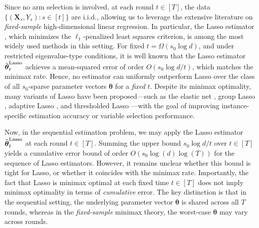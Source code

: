 \documentclass[aos,preprint]{imsart}
\theoremstyle{plain}
\theoremstyle{definition}
\newcommand{\btheta}{\boldsymbol{\theta}}
\newcommand{\bX}{\boldsymbol{X}}
\begin{document}
Since no arm selection is involved, at each round $t \in [T]$, the data $\{(\bX_s, Y_s): s \in [t]\}$ are i.i.d., allowing us to leverage the extensive literature on \textit{fixed-sample} high-dimensional linear regression. In particular, the Lasso estimator \cite{tibshirani1996regression}, which minimizes the $\ell_1$-penalized least squares criterion, is among the most widely used methods in this setting. For fixed $t = \Omega(s_0 \log d)$, and under restricted eigenvalue-type conditions, it is well known \citep{van2008high, van2016estimation, wainwright2019high} that the Lasso estimator $\hat{\btheta}_t^{\textup{Lasso}}$ achieves a mean-squared error of order $O(s_0 \log d / t)$, which matches the minimax rate. Hence, no estimator can uniformly outperform Lasso over the class of all $s_0$-sparse parameter vectors $\btheta$ for a \textit{fixed} $t$. 
Despite its minimax optimality, many variants of Lasso have been proposed---such as the elastic net \cite{zou2005regularization}, group Lasso \cite{yuan2006model}, adaptive Lasso \cite{zou2006adaptive}, and thresholded Lasso  \cite{van2011adaptive, belloni2013least}---with the goal of improving instance-specific estimation accuracy or variable selection performance.

Now, in the sequential estimation problem, we may apply the Lasso estimator $\hat{\btheta}_t^{\textup{Lasso}}$ at each round $t \in [T]$. Summing the upper bound $s_0 \log d  / t$ over $t \in [T]$  yields a cumulative error bound of order $O(s_0 \log(d) \log(T))$ for the sequence of Lasso estimators. However, it remains unclear whether this bound is tight for Lasso, or whether it coincides with the minimax rate. Importantly, the fact that Lasso is minimax optimal at each fixed time $t \in [T]$ does not imply minimax optimality in terms of \textit{cumulative} error. The key distinction is that in the sequential setting, the underlying parameter vector $\btheta$ is shared across all $T$ rounds, whereas in the \textit{fixed-sample} minimax theory, the worst-case $\btheta$ may vary across rounds.
\end{document}
